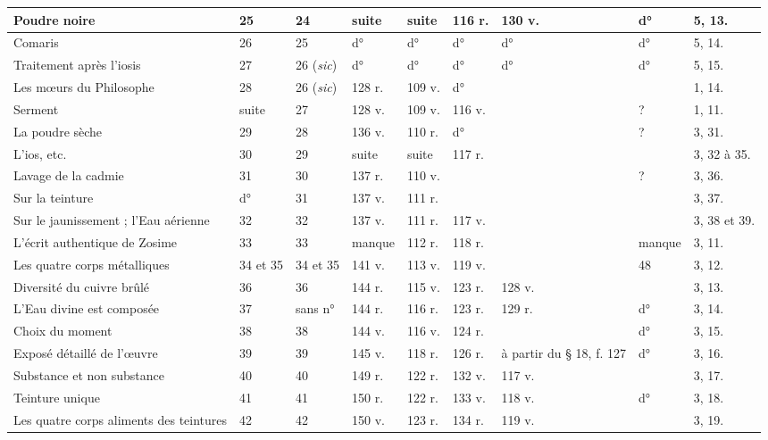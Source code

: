 \documentclass[a4paper, 11pt, oneside, polutonikogreek, french]{article}
\begin{document}
\begin{center}
\begin{longtable}{|p{20mm}|p{11mm}|p{11mm}|p{11mm}|p{11mm}|p{11mm}|p{11mm}|p{11mm}|p{15mm}|}
        Poudre noire & 25 & 24 & suite & suite & 116 r. & 130 v. & d° & 5, 13. \\ \hline
        Comaris & 26 & 25 & d° & d° & d° & d° & d° & 5, 14. \\ \hline
        Traitement après l'iosis & 27 & 26 (\emph{sic}) & d° & d° & d° & d° & d° & 5, 15. \\ \hline
        Les mœurs du Philosophe & 28 & 26 (\emph{sic}) & 128 r. & 109 v. & d° & ~ & ~ & 1, 14. \\ \hline
        Serment & suite & 27 & 128 v. & 109 v. & 116 v. & ~ & ? & 1, 11. \\ \hline
        La poudre sèche & 29 & 28 & 136 v. & 110 r. & d° & ~ & ? & 3, 31. \\ \hline
        L'ios, etc. & 30 & 29 & suite & suite & 117 r. & ~ & ~ & 3, 32 à 35. \\ \hline
        Lavage de la cadmie & 31 & 30 & 137 r. & 110 v. & ~ & ~ & ? & 3, 36. \\ \hline
        Sur la teinture & d° & 31 & 137 v. & 111 r. & ~ & ~ & ~ & 3, 37. \\ \hline
        Sur le jaunissement ; l'Eau aérienne & 32 & 32 & 137 v. & 111 r. & 117 v. & ~ & ~ & 3, 38 et 39. \\ \hline
        L'écrit authentique de Zosime & 33 & 33 & manque & 112 r. & 118 r. & ~ & manque & 3, 11. \\ \hline
        Les quatre corps métalliques & 34 et 35 & 34 et 35 & 141 v. & 113 v. & 119 v. & ~ & 48 & 3, 12. \\ \hline
        Diversité du cuivre brûlé & 36 & 36 & 144 r. & 115 v. & 123 r. & 128 v. & ~ & 3, 13. \\ \hline
        L'Eau divine est composée & 37 & sans n° & 144 r. & 116 r. & 123 r. & 129 r. & d° & 3, 14. \\ \hline
        Choix du moment & 38 & 38 & 144 v. & 116 v. & 124 r. & ~ & d° & 3, 15. \\ \hline
        Exposé détaillé de l'œuvre & 39 & 39 & 145 v. & 118 r. & 126 r. & à partir du § 18, f. 127 & d° & 3, 16. \\ \hline
        Substance et non substance & 40 & 40 & 149 r. & 122 r. & 132 v. & 117 v. & ~ & 3, 17. \\ \hline
        Teinture unique & 41 & 41 & 150 r. & 122 r. & 133 v. & 118 v. & d° & 3, 18. \\ \hline
        Les quatre corps aliments des teintures & 42 & 42 & 150 v. & 123 r. & 134 r. & 119 v. & ~ & 3, 19. \\ \hline

\end{longtable}
\end{center}
\end{document}
